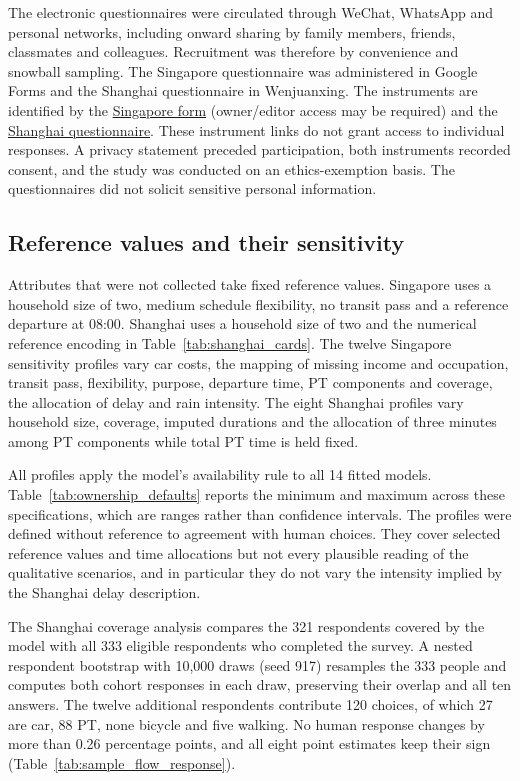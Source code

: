 The electronic questionnaires were circulated through WeChat, WhatsApp and personal networks, including onward sharing by family members, friends, classmates and colleagues. Recruitment was therefore by convenience and snowball sampling. The Singapore questionnaire was administered in Google Forms and the Shanghai questionnaire in Wenjuanxing. The instruments are identified by the \href{https://docs.google.com/forms/d/1fg4KzTXqDBLx1qgT1rOq9EEU6d2xPk4r-PXK0i8XzU4/edit}{Singapore form} (owner/editor access may be required) and the \href{https://v.wjx.cn/vm/YJnKeRu.aspx}{Shanghai questionnaire}. These instrument links do not grant access to individual responses. A privacy statement preceded participation, both instruments recorded consent, and the study was conducted on an ethics-exemption basis. The questionnaires did not solicit sensitive personal information.

\subsection{Reference values and their sensitivity}
Attributes that were not collected take fixed reference values. Singapore uses a household size of two, medium schedule flexibility, no transit pass and a reference departure at 08:00. Shanghai uses a household size of two and the numerical reference encoding in Table~\ref{tab:shanghai_cards}. The twelve Singapore sensitivity profiles vary car costs, the mapping of missing income and occupation, transit pass, flexibility, purpose, departure time, PT components and coverage, the allocation of delay and rain intensity. The eight Shanghai profiles vary household size, coverage, imputed durations and the allocation of three minutes among PT components while total PT time is held fixed.

All profiles apply the model's availability rule to all 14 fitted models. Table~\ref{tab:ownership_defaults} reports the minimum and maximum across these specifications, which are ranges rather than confidence intervals. The profiles were defined without reference to agreement with human choices. They cover selected reference values and time allocations but not every plausible reading of the qualitative scenarios, and in particular they do not vary the intensity implied by the Shanghai delay description.

The Shanghai coverage analysis compares the 321 respondents covered by the model with all 333 eligible respondents who completed the survey. A nested respondent bootstrap with 10,000 draws (seed 917) resamples the 333 people and computes both cohort responses in each draw, preserving their overlap and all ten answers. The twelve additional respondents contribute 120 choices, of which 27 are car, 88 PT, none bicycle and five walking. No human response changes by more than 0.26 percentage points, and all eight point estimates keep their sign (Table~\ref{tab:sample_flow_response}).

\FloatBarrier

